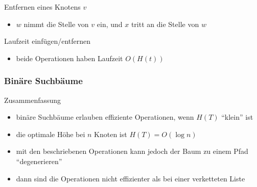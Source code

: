 \documentclass[aspectratio=1610, 11pt]{beamer}
\newcommand{\mytitle}{Bin\"are Suchb\"aume}
\begin{document}
\begin{frame}
\begin{overprint}
\begin{exampleblock}{Entfernen eines Knotens $v$}
\begin{itemize}
				\item $w$ nimmt die Stelle von $v$ ein, und $x$ tritt an die Stelle von $w$
			\end{itemize}
		\end{exampleblock}
		\begin{exampleblock}{Laufzeit einf\"ugen/entfernen}
			\begin{itemize}
				\item beide Operationen haben Laufzeit $O(H(t))$
			\end{itemize}
		\end{exampleblock}
	\end{overprint}
\end{frame}

\begin{frame}\frametitle{\mytitle}
		\begin{exampleblock}{Zusammenfassung}
			\begin{itemize}
				\item bin\"are Suchb\"aume erlauben effiziente Operationen, wenn $H(T)$ ``klein'' ist
				\item die optimale H\"ohe bei $n$ Knoten ist $H(T)=O(\log n)$
				\item mit den beschriebenen Operationen kann jedoch der Baum zu einem Pfad ``degenerieren''
				\item dann sind die Operationen nicht effizienter als bei einer verketteten Liste
			\end{itemize}
		\end{exampleblock}
\end{frame}
\end{document}
